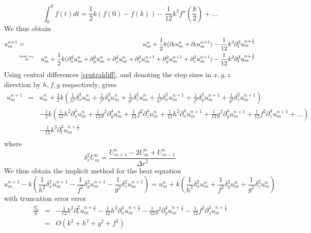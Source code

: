 \begin{equation}
\int_0^k f(t) dt = \frac{1}{2} k (f(0) - f(k)) -\frac{1}{12} k^3 f''(\frac{k}{2}) + ...
\label{trapezoidalrule}
\end{equation}
We thus obtain
\begin{eqnarray}
\label{res}
u_m^ {n+1} &=& u_m^ n + \frac{1}{2} k(\partial_t u_m^n + \partial_t u_m^{n+1}) - \frac{1}{12} k^3 \partial_t ^3 u_m^{n+\frac{1}{2}} \\
&\stackrel{\text{\tiny heat eq.}}{=}& u_m^ n + \frac{1}{2} k(\partial_x^2 u_m^n + \partial_y^2 u_m^n + \partial_z^2 u_m^n + \partial_x^2 u_m^{n+1} + \partial_y^2 u_m^{n+1} + \partial_z^2 u_m^{n+1}) - \frac{1}{12} k^3 \partial_t ^3    u_m^{n+\frac{1}{2}} \nonumber
\end{eqnarray}
Using central differences \cref{centraldiff}, and denoting the step sizes in $x, y, z$ direction by $h, f, g$ respectively, gives
\begin{eqnarray*}
u_m^{n+1} &=& u_m^ n + \frac{1}{2} k(\frac{1}{h^2}\delta_x^2 u_m^n + \frac{1}{f^2}\delta_y^2 u_m^n + \frac{1}{g^2}\delta_z^2 u_m^n + \frac{1}{h^2}\delta_x^2 u_m^{n+1} + \frac{1}{f^2}\delta_y^2 u_m^{n+1} + \frac{1}{g^2}\delta_z^2 u_m^{n+1}) \\
  &&- \frac{1}{2} k (\frac{1}{12}h^2\partial_x^4 u_m^n + \frac{1}{12}g^2\partial_y^4 u_m^n + \frac{1}{12}f^2\partial_z^4 u_m^n + \frac{1}{12}h^2\partial_x^4 u_m^{n+1} + \frac{1}{12}g^2\partial_y^4 u_m^{n+1} + \frac{1}{12}f^2\partial_z^4 u_m^{n+1} + ...) \\
  &&- \frac{1}{12} k^3 \partial_t ^3 u_m^{n+\frac{1}{2}} \\ 
\end{eqnarray*}
where
\begin{equation}
\delta_{r}^{2}U_m^{n}=\frac{U_{m+1}^{n}-2U_m^{n}+U_{m-1}^{n}}{{\Delta r}^{2}}
\label{centraldiff}
\end{equation}
We thus obtain the implicit method for the heat equation
\begin{equation}
u_m^{n+1}-k(\frac{1}{h^2}\delta_x^2 u_m^{n+1}-\frac{1}{f^2}\delta_y^2 u_m^{n+1}-\frac{1}{g^2}\delta_z^2 u_m^{n+1})=u_m^n + k(\frac{1}{h^2}\delta_x^2 u_m^n + \frac{1}{f^2}\delta_y^2 u_m^n +\frac{1}{g^2}\delta_z^2 u_m^n)
\label{crank}
\end{equation}
with truncation error error
\begin{eqnarray}
\frac{\tau_m^ n}{k} &=& -\frac{1}{12} k^2 \partial_t^2 u_m^{n+\frac{1}{2}} - \frac{1}{12} h^2 \partial_x^4 u_m^{n+\frac{1}{2}} - \frac{1}{12} g^2 \partial_y^4 u_m^{n+\frac{1}{2}} - \frac{1}{12} f^2 \partial_z^4 u_m^{n+\frac{1}{2}}\\
&=& O(k^2 + h^2 + g^2 + f^2)
\label{truncerror}
\end{eqnarray}

